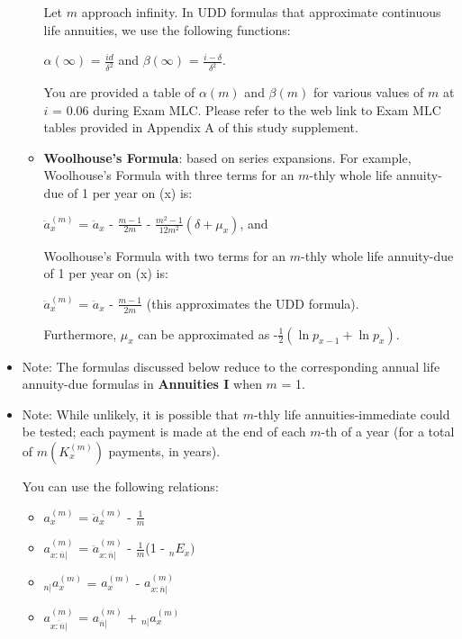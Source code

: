 \documentclass[]{book}
\begin{document}
\begin{itemize}
\begin{itemize}
    Let \(m\) approach infinity. In UDD formulas that approximate
    continuous life annuities, we use the following functions:

    \(\alpha(\infty)\) = \(\frac{id}{\delta^2}\) and \(\beta(\infty)\) =
    \(\frac{i - \delta}{\delta^2}\).

    You are provided a table of \(\alpha(m)\) and \(\beta(m)\) for
    various values of \(m\) at \(i\) = 0.06 during Exam MLC. Please
    refer to the web link to Exam MLC tables provided in Appendix A of
    this study supplement.
  \item
    \textbf{Woolhouse's Formula}: based on series expansions. For
    example, Woolhouse's Formula with three terms for an \(m\)-thly
    whole life annuity-due of 1 per year on (x) is:

    \(\ddot{a}^{(m)}_x\) = \(\ddot{a}_x\) - \(\frac{m - 1}{2m}\) -
    \(\frac{m^2 - 1}{12m^2}\)\((\delta + \mu_x)\), and

    Woolhouse's Formula with two terms for an \(m\)-thly whole life
    annuity-due of 1 per year on (x) is:

    \(\ddot{a}^{(m)}_x\) = \(\ddot{a}_x\) - \(\frac{m - 1}{2m}\) (this
    approximates the UDD formula).

    Furthermore, \(\mu_x\) can be approximated as
    -\(\frac{1}{2}\)\((\ln p_{x - 1} + \ln p_x)\).
  \end{itemize}
\item
  Note: The formulas discussed below reduce to the corresponding annual
  life annuity-due formulas in \textbf{Annuities I} when \(m\) = 1.
\end{itemize}

\begin{itemize}
\item
  Note: While unlikely, it is possible that \(m\)-thly life
  annuities-immediate could be tested; each payment is made at the end
  of each \(m\)-th of a year (for a total of \(m (K^{(m)}_x)\) payments,
  in years).

  You can use the following relations:

  \begin{itemize}
  \item
    \(a^{(m)}_x\) = \(\ddot{a}^{(m)}_x\) - \(\frac{1}{m}\)
  \item
    \(a^{(m)}_{x :\overline{n}|}\) =
    \(\ddot{a}^{(m)}_{x :\overline{n}|}\) - \(\frac{1}{m}\)(1 -
    \({}_{n}E_x)\)
  \item
    \({}_{n|}a^{(m)}_x\) = \(a^{(m)}_x\) -
    \(a^{(m)}_{x :\overline{n}|}\)
  \item
    \(a^{(m)}_{\overline{x :\overline{n}|}}\) =
    \(a^{(m)}_{\overline{n}|}\) + \({}_{n|}a^{(m)}_x\)
  \end{itemize}
\end{itemize}
\end{document}
